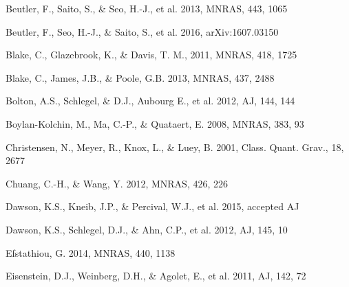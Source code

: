 \documentclass[iop]{emulateapj}
\begin{document}
\begin{thebibliography}{}
Beutler, F., Saito, S., \& Seo, H.-J., et al. 2013, MNRAS, 443, 1065

Beutler, F., Seo, H.-J., \& Saito, S., et al. 2016,
arXiv:1607.03150

Blake, C., Glazebrook, K., \& Davis, T. M., 2011, MNRAS, 418, 1725  

Blake, C., James, J.B., \& Poole, G.B. 2013, MNRAS, 437, 2488

Bolton, A.S., Schlegel, \& D.J., Aubourg E., et al. 2012, AJ, 144, 144

Boylan-Kolchin, M., Ma, C.-P., \& Quataert, E. 2008, MNRAS, 383, 93






Christensen, N., Meyer, R., Knox, L., \& Luey, B. 2001, Class. Quant. Grav., 18, 2677


Chuang, C.-H., \& Wang, Y. 2012, MNRAS, 426, 226  



Dawson, K.S., Kneib, J.P., \& Percival, W.J., et al. 2015, accepted AJ

Dawson, K.S., Schlegel, D.J., \& Ahn, C.P., et al. 2012, AJ, 145, 10

Efstathiou, G. 2014, MNRAS, 440, 1138

Eisenstein, D.J.,  Weinberg, D.H., \& Agolet, E., et al. 2011, AJ, 142, 72


\end{thebibliography}
\end{document}
